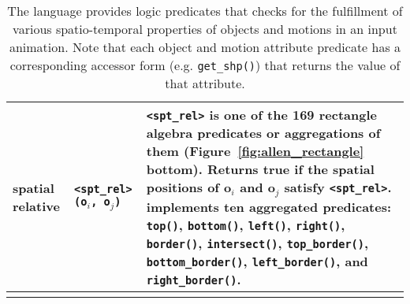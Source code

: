 \begin{table*}[t]
{\begin{tabular}{p{}p{}p{}}
  \\
%
spatial relative &
  \texttt{<spt\_rel>(o$_i$, o$_j$)} &
  \texttt{<spt\_rel>} is one of the 169 rectangle algebra predicates or aggregations of them (Figure~\ref{fig:allen_rectangle} bottom). Returns true if the spatial positions of o$_i$ and o$_j$ satisfy \texttt{<spt\_rel>}.
  \dslname{} implements ten aggregated predicates: \texttt{top()}, \texttt{bottom()}, \texttt{left()}, \texttt{right()}, \texttt{border()}, \texttt{intersect()}, \texttt{top\_border()}, \texttt{bottom\_border()}, \texttt{left\_border()}, and \texttt{right\_border()}.
\\
\bottomrule
\\
\end{tabular}%
}
\vspace{-1em}
\caption{The \dslname{} language provides logic predicates that checks for the fulfillment of various spatio-temporal properties of objects and motions in an input animation. Note that each object and motion attribute predicate has a corresponding  accessor form (e.g. {\tt get\_shp()}) that returns the value of that attribute.
}
\vspace{-2em}
\label{tab:predicates}
\end{table*}
